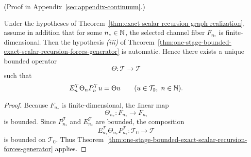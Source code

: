 (Proof in Appendix~\ref{sec:appendix-continuum}.)

\begin{corollary}
\label{cor:finite-exact-channel-stage-forces-bounded-generator}
Under the hypotheses of
Theorem~\ref{thm:exact-scalar-recursion-graph-realization}, assume in addition
that for some \(n_\ast\in\mathbb{N}\), the selected channel fiber \(F_{n_\ast}\) is
finite-dimensional. Then the hypothesis \emph{(iii)} of
Theorem~\ref{thm:one-stage-bounded-exact-scalar-recursion-forces-generator} is
automatic. Hence there exists a unique bounded operator
\[
\Theta:\mathcal T\to\mathcal T
\]
such that
\[
E_n^{\mathcal T}\Theta_nP_n^{\mathcal T}u=\Theta u
\qquad (u\in\mathcal T_0,\ n\in\mathbb{N}).
\]
\end{corollary}

\begin{proof}
Because \(F_{n_\ast}\) is finite-dimensional, the linear map
\[
\Theta_{n_\ast}:F_{n_\ast}\to F_{n_\ast}
\]
is bounded. Since \(P_{n_\ast}^{\mathcal T}\) and \(E_{n_\ast}^{\mathcal T}\)
are bounded, the composition
\[
E_{n_\ast}^{\mathcal T}\Theta_{n_\ast}P_{n_\ast}^{\mathcal T}:\mathcal T_0\to\mathcal T
\]
is bounded on \(\mathcal T_0\). Thus
Theorem~\ref{thm:one-stage-bounded-exact-scalar-recursion-forces-generator}
applies.
\end{proof}

